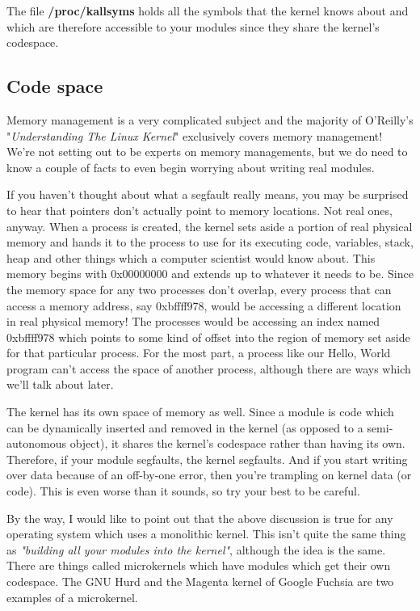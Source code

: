 \documentclass[10pt, oneside]{book}
\begin{document}
The file \textbf{/proc/kallsyms} holds all the symbols that the kernel knows about and which are therefore accessible to your modules since they share the kernel's codespace.

\subsection{Code space}
\label{sec:orgc8229f4}
Memory management is a very complicated subject and the majority of O'Reilly's "\emph{Understanding The Linux Kernel}" exclusively covers memory management! We're not setting out to be experts on memory managements, but we do need to know a couple of facts to even begin worrying about writing real modules.

If you haven't thought about what a segfault really means, you may be surprised to hear that pointers don't actually point to memory locations. Not real ones, anyway. When a process is created, the kernel sets aside a portion of real physical memory and hands it to the process to use for its executing code, variables, stack, heap and other things which a computer scientist would know about. This memory begins with 0x00000000 and extends up to whatever it needs to be. Since the memory space for any two processes don't overlap, every process that can access a memory address, say 0xbffff978, would be accessing a different location in real physical memory! The processes would be accessing an index named 0xbffff978 which points to some kind of offset into the region of memory set aside for that particular process. For the most part, a process like our Hello, World program can't access the space of another process, although there are ways which we'll talk about later.

The kernel has its own space of memory as well. Since a module is code which can be dynamically inserted and removed in the kernel (as opposed to a semi-autonomous object), it shares the kernel's codespace rather than having its own. Therefore, if your module segfaults, the kernel segfaults. And if you start writing over data because of an off-by-one error, then you're trampling on kernel data (or code). This is even worse than it sounds, so try your best to be careful.

By the way, I would like to point out that the above discussion is true for any operating system which uses a monolithic kernel. This isn't quite the same thing as \emph{"building all your modules into the kernel"}, although the idea is the same. There are things called microkernels which have modules which get their own codespace. The GNU Hurd and the Magenta kernel of Google Fuchsia are two examples of a microkernel.
\end{document}
